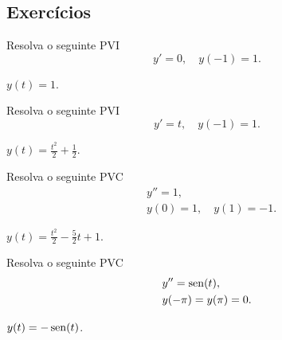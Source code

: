 \subsection*{Exercícios}

\begin{exer}
  Resolva o seguinte PVI
  \begin{equation}
    y' = 0,\quad y(-1) = 1.
  \end{equation}
\end{exer}
\begin{resp}
  $y(t) = 1$.
\end{resp}

\begin{exer}
  Resolva o seguinte PVI
  \begin{equation}
    y' = t,\quad y(-1) = 1.
  \end{equation}
\end{exer}
\begin{resp}
  $y(t) = \frac{t^2}{2} + \frac{1}{2}$.
\end{resp}

\begin{exer}
  Resolva o seguinte PVC
  \begin{align}
    &y'' = 1,\\
    &y(0)=1,\quad y(1)=-1.
  \end{align}
\end{exer}
\begin{resp}
  $y(t) = \frac{t^2}{2} - \frac{5}{2}t + 1$.
\end{resp}

\begin{exer}
  Resolva o seguinte PVC
  \begin{align}
    &y'' = \operatorname{sen}(t),\\
    &y(-\pi)=y(\pi)=0.
  \end{align}
\end{exer}
\begin{resp}
  $y(t) = -\operatorname{sen}(t)$.
\end{resp}